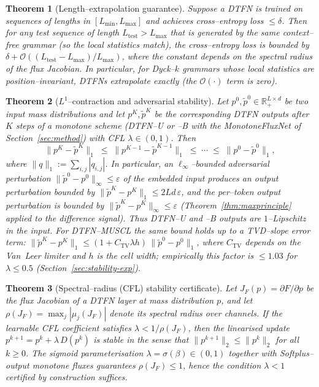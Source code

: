 \documentclass[10pt]{article}
\newtheorem{theorem}{Theorem}
\theoremstyle{definition}
\theoremstyle{remark}
\newcommand{\Rplus}{\mathbb{R}_+}
\begin{document}
\begin{theorem}[Length--extrapolation guarantee]
  \label{thm:extrap}
  Suppose a DTFN is trained on sequences of lengths in
  $[L_{\min}, L_{\max}]$ and achieves cross--entropy loss $\le \delta$.
  Then for any test sequence of length $L_{\mathrm{test}} > L_{\max}$ that
  is generated by the same context--free grammar (so the local
  statistics match), the cross--entropy loss is bounded by
  $\delta + \mathcal{O}((L_{\mathrm{test}}-L_{\max})/L_{\max})$, where the
  constant depends on the spectral radius of the flux Jacobian.  In
  particular, for Dyck--$k$ grammars whose local statistics are
  position--invariant, DTFNs extrapolate \emph{exactly} (the
  $\mathcal{O}(\cdot)$ term is zero).
\end{theorem}

\begin{theorem}[$L^1$--contraction and adversarial stability]
  \label{thm:l1}
  Let $p^0, \tilde p^0 \in \Rplus^{L\times d}$ be two input mass
  distributions and let $p^K, \tilde p^K$ be the corresponding DTFN
  outputs after $K$ steps of a monotone scheme (DTFN--U or --B with
  the MonotoneFluxNet of Section~\ref{sec:method}) with CFL
  $\lambda\in(0,1)$.  Then
  \[
    \big\| p^K - \tilde p^K \big\|_{1} \;\le\;
    \big\| p^{K-1} - \tilde p^{K-1} \big\|_{1}
    \;\le\; \cdots \;\le\;
    \big\| p^0 - \tilde p^0 \big\|_{1},
  \]
  where $\|q\|_1 := \sum_{i,j} |q_{i,j}|$.  In particular, an
  $\ell_\infty$--bounded adversarial perturbation
  $\|\tilde p^0 - p^0\|_\infty \le \varepsilon$ of the embedded input
  produces an output perturbation bounded by
  $\|\tilde p^K - p^K\|_1 \le 2 L d\, \varepsilon$, and the
  \emph{per--token} output perturbation is bounded by
  $\|\tilde p^K - p^K\|_\infty \le \varepsilon$ (Theorem~\ref{thm:maxprinciple}
  applied to the difference signal).  Thus DTFN--U and --B outputs are
  $1$--Lipschitz in the input.  For DTFN--MUSCL the same bound holds up
  to a TVD--slope error term: $\|\tilde p^K - p^K\|_1 \le (1 + C_{\mathrm{TV}}\lambda h)\,
  \|\tilde p^0 - p^0\|_1$, where $C_{\mathrm{TV}}$ depends on the Van~Leer limiter
  and $h$ is the cell width; empirically this factor is $\le 1.03$ for
  $\lambda \le 0.5$ (Section~\ref{sec:stability-exp}).
\end{theorem}

\begin{theorem}[Spectral--radius (CFL) stability certificate]
  \label{thm:cfl}
  Let $J_F(p) = \partial F / \partial p$ be the flux Jacobian of a
  DTFN layer at mass distribution $p$, and let
  $\rho(J_F) = \max_{j} |\mu_j(J_F)|$ denote its spectral radius over
  channels.  If the learnable CFL coefficient satisfies
  $\lambda < 1 / \rho(J_F)$, then the linearised update
  $p^{k+1} = p^k + \lambda\, D(p^k)$ is stable in the sense that
  $\|p^{k+1}\|_2 \le \|p^k\|_2$ for all $k\ge 0$.  The sigmoid
  parameterisation $\lambda = \sigma(\beta)\in(0,1)$ together with
  Softplus--output monotone fluxes guarantees $\rho(J_F)\le 1$,
  hence the condition $\lambda < 1$ certified by construction
  suffices.
\end{theorem}
\end{document}
